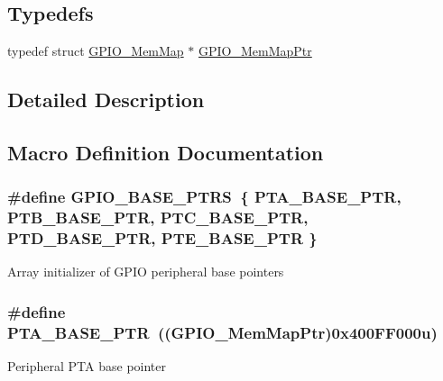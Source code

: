 \subsection*{Typedefs}
\begin{DoxyCompactItemize}
\item 
typedef struct \hyperlink{struct_g_p_i_o___mem_map}{G\+P\+I\+O\+\_\+\+Mem\+Map} $\ast$ \hyperlink{group___g_p_i_o___peripheral_ga31c1eddda45aa085f51142987e05ada5}{G\+P\+I\+O\+\_\+\+Mem\+Map\+Ptr}
\end{DoxyCompactItemize}


\subsection{Detailed Description}


\subsection{Macro Definition Documentation}
\hypertarget{group___g_p_i_o___peripheral_gad0f7206167a584b1e75a81a5c30fa1c2}{}
\subsubsection[{G\+P\+I\+O\+\_\+\+B\+A\+S\+E\+\_\+\+P\+T\+R\+S}]{\setlength{\rightskip}{0pt plus 5cm}\#define G\+P\+I\+O\+\_\+\+B\+A\+S\+E\+\_\+\+P\+T\+R\+S~\{ {\bf P\+T\+A\+\_\+\+B\+A\+S\+E\+\_\+\+P\+T\+R}, {\bf P\+T\+B\+\_\+\+B\+A\+S\+E\+\_\+\+P\+T\+R}, {\bf P\+T\+C\+\_\+\+B\+A\+S\+E\+\_\+\+P\+T\+R}, {\bf P\+T\+D\+\_\+\+B\+A\+S\+E\+\_\+\+P\+T\+R}, {\bf P\+T\+E\+\_\+\+B\+A\+S\+E\+\_\+\+P\+T\+R} \}}\label{group___g_p_i_o___peripheral_gad0f7206167a584b1e75a81a5c30fa1c2}
Array initializer of G\+P\+I\+O peripheral base pointers \hypertarget{group___g_p_i_o___peripheral_gadf98f6ee2bbfd42102e378a66b29b9ef}{}
\subsubsection[{P\+T\+A\+\_\+\+B\+A\+S\+E\+\_\+\+P\+T\+R}]{\setlength{\rightskip}{0pt plus 5cm}\#define P\+T\+A\+\_\+\+B\+A\+S\+E\+\_\+\+P\+T\+R~(({\bf G\+P\+I\+O\+\_\+\+Mem\+Map\+Ptr})0x400\+F\+F000u)}\label{group___g_p_i_o___peripheral_gadf98f6ee2bbfd42102e378a66b29b9ef}
Peripheral P\+T\+A base pointer \hypertarget{group___g_p_i_o___peripheral_ga59ab0f28e891ea28f152505ce2021747}{}
